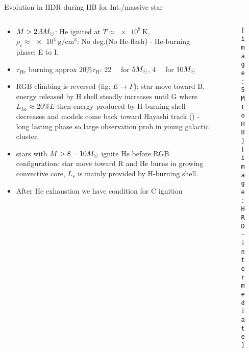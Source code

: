 \begin{frame}{Evolution in HDR during HB for Int./massive star}
\begin{columns}[T]
	\begin{column}{0.55\textwidth}
	\begin{itemize}
        \item $M>2.3M_{\odot}$: He ignited at $T\approx\SI{e8}{\kelvin}$, $\rho_c\approx\SI{e4}{\gram\per\cubic\cm}$: No \Pelectron deg.(No He-flash) - He-burning phase: E to I.
        \item $\tau_{He}$ burning approx $20\%\tau_H$: \SI{22}{\mega\year} for $5M_{\odot}$, \SI{4}{\mega\year} for $10M_{\odot}$
	\item RGB climbing is reversed (fig: $E\to F$): star move toward B, energy released by H shell steadly increases until G where $L_{3\alpha}\approx20\%L$ then energy produced by H-burning shell decreases and models come back toward Hayashi track () - long lasting phase so large observation prob in young galactic cluster.
    \item stars with $M>8-10M_{\odot}$ ignite He before RGB configuration: star move toward R and He burns in growing convective core, $L_s$ is mainly provided by H-burning shell.
	\item After He exhaustion we have condition for C ignition
	\end{itemize}
	\end{column}
	\begin{column}{0.45\textwidth}
	\begin{figure}[!ht]
	\texttt{[image: 5MtoHB]}\label{fig:5MtoHB}
	\texttt{[image: HRD-intermediate]}\label{fig:HRD-intermediate}
	\end{figure}
\end{column}\end{columns}
\end{frame}

